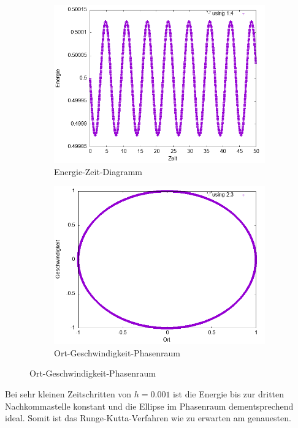 \documentclass[
    oneside,
    ngerman,
    footinclude=false,
    captions=tableheading,
    DIV=12
]{scrartcl}
\begin{document}
            \begin{figure}[H]
            \centering
            \begin{subfigure}[b]{0.45\textwidth}
                \centering
                \includegraphics[width=\textwidth]{Bilddateien/RK2A1(a)-0001-E.png}
                \caption{Energie-Zeit-Diagramm}
                \label{fig:RK2A1(a)-0001-0-E}
            \end{subfigure}
            \hfill
            \begin{subfigure}[b]{0.45\textwidth}
                \centering
                \includegraphics[width=\textwidth]{Bilddateien/RK2A1(a)-0001-0-xv.png}
                \caption{Ort-Geschwindigkeit-Phasenraum}
                \label{fig:RK2A1(a)-0001-0-xv}
            \end{subfigure}
            \end{figure}
            Bei sehr kleinen Zeitschritten von $h=0.001$ ist die Energie bis zur dritten Nachkommastelle konstant und die Ellipse im Phasenraum dementsprechend ideal. Somit ist das Runge-Kutta-Verfahren wie zu erwarten am genauesten.
            \newpage
\end{document}
